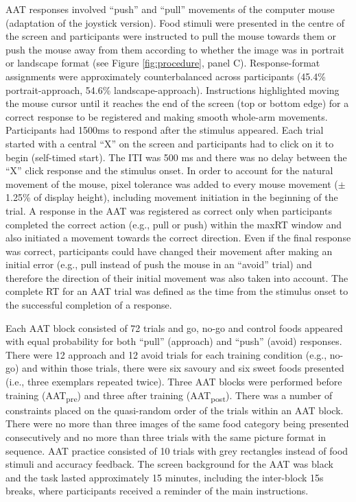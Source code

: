 \documentclass[man,floatsintext]{apa6}
\begin{document}
AAT responses involved \enquote{push} and \enquote{pull} movements of the computer mouse (adaptation of the joystick version). Food stimuli were presented in the centre of the screen and participants were instructed to pull the mouse towards them or push the mouse away from them according to whether the image was in portrait or landscape format (see Figure \ref{fig:procedure}, panel C). Response-format assignments were approximately counterbalanced across participants (45.4\% portrait-approach, 54.6\% landscape-approach). Instructions highlighted moving the mouse cursor until it reaches the end of the screen (top or bottom edge) for a correct response to be registered and making smooth whole-arm movements. Participants had 1500ms to respond after the stimulus appeared. Each trial started with a central \enquote{X} on the screen and participants had to click on it to begin (self-timed start). The ITI was 500 ms and there was no delay between the \enquote{X} click response and the stimulus onset. In order to account for the natural movement of the mouse, pixel tolerance was added to every mouse movement (\(\pm\) 1.25\% of display height), including movement initiation in the beginning of the trial. A response in the AAT was registered as correct only when participants completed the correct action (e.g., pull or push) within the maxRT window and also initiated a movement towards the correct direction. Even if the final response was correct, participants could have changed their movement after making an initial error (e.g., pull instead of push the mouse in an \enquote{avoid} trial) and therefore the direction of their initial movement was also taken into account. The complete RT for an AAT trial was defined as the time from the stimulus onset to the successful completion of a response.

\par

Each AAT block consisted of 72 trials and go, no-go and control foods appeared with equal probability for both \enquote{pull} (approach) and \enquote{push} (avoid) responses. There were 12 approach and 12 avoid trials for each training condition (e.g., no-go) and within those trials, there were six savoury and six sweet foods presented (i.e., three exemplars repeated twice). Three AAT blocks were performed before training (AAT\textsubscript{pre}) and three after training (AAT\textsubscript{post}). There was a number of constraints placed on the quasi-random order of the trials within an AAT block. There were no more than three images of the same food category being presented consecutively and no more than three trials with the same picture format in sequence. AAT practice consisted of 10 trials with grey rectangles instead of food stimuli and accuracy feedback. The screen background for the AAT was black and the task lasted approximately 15 minutes, including the inter-block 15s breaks, where participants received a reminder of the main instructions.
\end{document}
